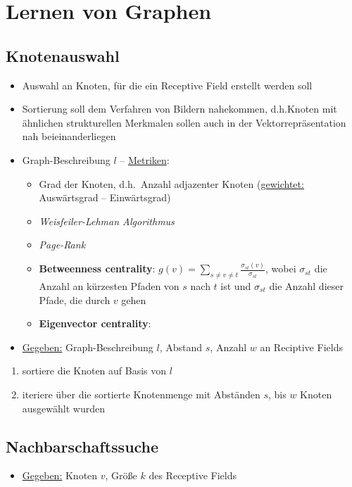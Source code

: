 \section{Lernen von Graphen}

\subsection{Knotenauswahl}

\begin{itemize}
  \item Auswahl an Knoten, für die ein Receptive Field erstellt werden soll
  \item Sortierung soll dem Verfahren von Bildern nahekommen, d.h.\ Knoten mit ähnlichen strukturellen Merkmalen sollen auch in der Vektorrepräsentation nah beieinanderliegen
  \item Graph-Beschreibung $l$ – \underline{Metriken}:
  \begin{itemize}
    \item Grad der Knoten, d.h.\ Anzahl adjazenter Knoten (\underline{gewichtet:} Auswärtsgrad – Einwärtsgrad)
    \item \emph{Weisfeiler-Lehman Algorithmus}
    \item \emph{Page-Rank}
    \item \textbf{Betweenness centrality}: $g(v) = \sum_{s \neq v \neq t} \frac{\sigma_{st}(v)}{\sigma_{st}}$, wobei $\sigma_{st}$ die Anzahl an kürzesten Pfaden von $s$ nach $t$ ist und $\sigma_{st}$ die Anzahl dieser Pfade, die durch $v$ gehen
    \item \textbf{Eigenvector centrality}:
  \end{itemize}
  \item \underline{Gegeben:} Graph-Beschreibung $l$, Abstand $s$, Anzahl $w$ an Reciptive Fields
\end{itemize}

\begin{enumerate}
  \item sortiere die Knoten auf Basis von $l$
  \item iteriere über die sortierte Knotenmenge mit Abständen $s$, bis $w$ Knoten ausgewählt wurden
\end{enumerate}

\subsection{Nachbarschaftssuche}

\begin{itemize}
  \item \underline{Gegeben:} Knoten $v$, Größe $k$ des Receptive Fields
\end{itemize}

